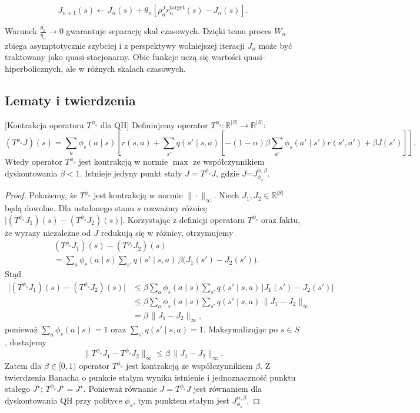 \begin{equation}
    J_{n+1}(s) \leftarrow J_{n}(s) + \theta_{n} \left[ \rho_n^J r_{n}^{\text{target}}(s) - J_{n}(s) \right].
    \label{eq:update_J}
\end{equation}

Warunek $\frac{\theta_n}{\eta_n} \to 0$ gwarantuje separację skal czasowych. Dzięki temu proces $W_n$ zbiega asymptotycznie szybciej i z perspektywy wolniejszej iteracji $J_n$ może być traktowany jako quasi-stacjonarny. Obie funkcje uczą się wartości quasi-hiperbolicznych, ale w różnych skalach czasowych.
\subsection{Lematy i twierdzenia}
\begin{lemma}\cite{eshwar2025}[Kontrakcja operatora $T^{\phi_s}$ dla QH]
\label{thm:bellman-contraction}
Definiujemy operator $T^{\phi_s}: \mathbb{R}^{|S|} \to \mathbb{R}^{|S|}$:
\begin{equation}
(T^{\phi_s} J)(s) = \sum_a \phi_s(a\mid s) \left[ r(s, a) + \sum_{s'} q(s'\mid s, a) \left[ -(1 - \alpha)\beta \sum_{a'} \phi_s(a'\mid s') r(s', a') + \beta J(s') \right] \right].
\end{equation}
Wtedy operator $T^{\phi_s}$ jest kontrakcją w normie $\max$ ze współczynnikiem dyskontowania $\beta < 1$. Istnieje jedyny punkt stały $J = T^{\phi_s} J$, gdzie $J$=$J^{\alpha, \beta}_{\phi_s}$.
\end{lemma}
\begin{proof}
Pokażemy, że $T^{\phi_s}$ jest kontrakcją w normie $\|\cdot\|_\infty$.
Niech $J_1, J_2 \in \mathbb{R}^{|S|}$ będą dowolne. Dla ustalonego stanu $s$ rozważmy różnicę
 $\bigl|(T^{\phi_s}J_1)(s) - (T^{\phi_s}J_2)(s)\bigr|$.
Korzystając z definicji operatora $T^{\phi_s}$ oraz faktu, że wyrazy niezależne od $J$ redukują się w różnicy, otrzymujemy
\[
\begin{aligned}
&(T^{\phi_s}J_1)(s) - (T^{\phi_s}J_2)(s) \\
&= \sum_a \phi_s(a\mid s) \sum_{s'} q(s'\mid s,a)\, \beta\bigl(J_1(s') - J_2(s')\bigr).
\end{aligned}
\]
Stąd
\[
\begin{aligned}
\bigl|(T^{\phi_s}J_1)(s) - (T^{\phi_s}J_2)(s)\bigr|
&\leq \beta \sum_a \phi_s(a\mid s) \sum_{s'} q(s'\mid s,a)\, \bigl|J_1(s') - J_2(s')\bigr| \\
&\leq \beta \sum_a \phi_s(a\mid s) \sum_{s'} q(s'\mid s,a)\, \|J_1 - J_2\|_\infty \\
&= \beta\,\|J_1 - J_2\|_\infty,
\end{aligned}
\]
ponieważ $\sum_a \phi_s(a\mid s)=1$ oraz $\sum_{s'} q(s'\mid s,a)=1$.
Maksymalizując po $s \in S$, dostajemy
\[
\|T^{\phi_s}J_1 - T^{\phi_s}J_2\|_\infty \leq \beta\,\|J_1 - J_2\|_\infty.
\]
Zatem dla $\beta \in [0,1)$ operator $T^{\phi_s}$ jest kontrakcją ze współczynnikiem $\beta$.
Z twierdzenia Banacha o punkcie stałym wynika istnienie i jednoznaczność punktu stałego $J^\star$; $T^{\phi_s}J^\star = J^\star$. Ponieważ równanie $J = T^{\phi_s}J$ jest równaniem dla dyskontowania QH przy polityce $\phi_s$, tym punktem stałym jest $J^{\alpha,\beta}_{\phi_s}$.
\end{proof}

